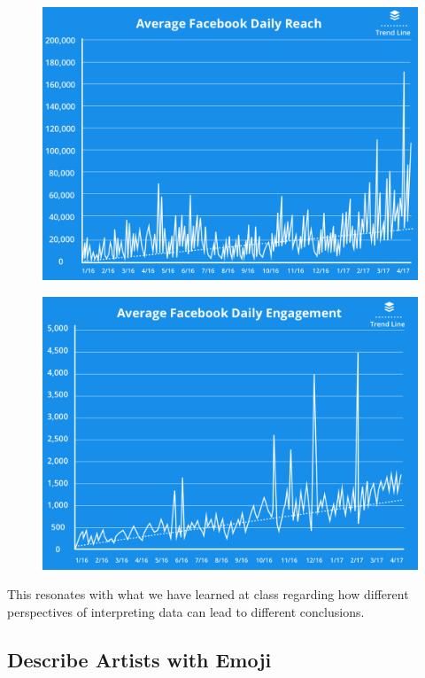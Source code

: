 \documentclass[]{book}
\theoremstyle{definition}
\theoremstyle{definition}
\theoremstyle{definition}
\theoremstyle{remark}
\begin{document}
\begin{figure}
\centering
\includegraphics{images/average-facebook-reach.png}
\caption{}
\end{figure}

\begin{figure}
\centering
\includegraphics{images/average-facebook-daily-reach.png}
\caption{}
\end{figure}

This resonates with what we have learned at class regarding how
different perspectives of interpreting data can lead to different
conclusions.

\subsection{Describe Artists with
Emoji}\label{describe-artists-with-emoji}
\end{document}
